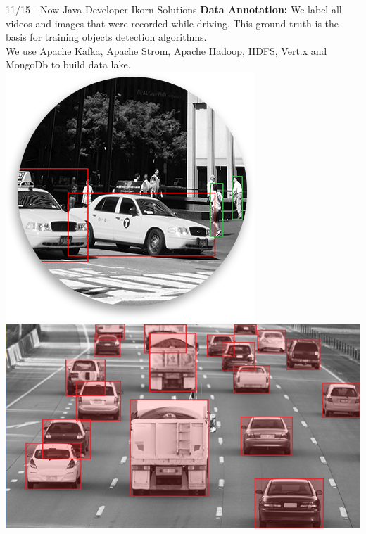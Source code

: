 \documentclass[]{friggeri-cv}
\begin{document}
\begin{entrylist}
\entry
    {11/15 - Now}
    {Java Developer}
    {Ikorn Solutions}
	{\textbf{ Data Annotation: } We label all videos and images that were recorded while driving. This ground truth is the basis for training objects detection algorithms.\\
	We use Apache Kafka, Apache Strom, Apache Hadoop, HDFS, Vert.x and MongoDb to build data lake.\\
		
	\includegraphics[scale=0.3]{img/labeling_img_14.png}
	\includegraphics[scale=0.3]{img/labeling_img_5_1.png}\\

}
\end{entrylist}
\end{document}
